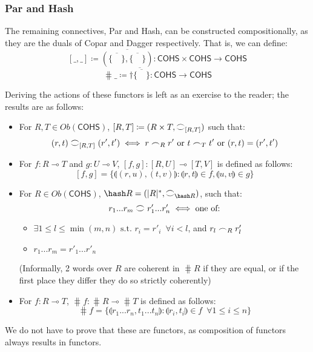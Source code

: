 \documentclass[11pt, oneside]{article}
\theoremstyle{plain}
\theoremstyle{definition}
\let\originaldagger\dagger
\renewcommand{\dag}{\mathord{\originaldagger}}
\newcommand{\lp}{\llparenthesis}
\newcommand{\rp}{\rrparenthesis}
\newcommand{\cohs}{{\mathsf{COHS}}}
\newcommand{\coh}[1][]{\mathrel{\vcenter{\offinterlineskip\hbox{$\frown$}\vskip0.2ex\hbox{$\smile$}}_{\ifx\\#1\\\else#1\fi}}}
\newcommand{\scoh}[1][]{\mathrel{\frown}_{\ifx\\#1\\\else#1\fi}}
\begin{document}
\subsubsection{Par and Hash}
The remaining connectives, Par and Hash, can be constructed compositionally, as they are the duals of Copar and Dagger respectively.
That is, we can define:
$$[\_,\_]\coloneqq\overline{(\overline{\{\quad\}},\overline{\{\quad\}})}:\cohs\times\cohs\to\cohs$$
$$\hash \_\coloneqq\overline{\dag\overline{\{\quad\}}}:\cohs\to\cohs$$

Deriving the actions of these functors is left as an exercise to the reader; the results are as follows:

\begin{itemize}
    \item
    For $R,T\in Ob(\cohs)$, $[R,T] \coloneqq (R\times T,\coh[{[R,T]}])$ such that:
    $$(r,t)\coh[{[R,T]}](r',t')\iff r\scoh[R]r'\text{ or }t\scoh[T]t'\text{ or }(r,t)=(r',t')$$

    \item
    For $f:R\multimap T$ and $g:U\multimap V$, 
    $[f,g]:[R,U]\multimap[T,V]$ is defined as follows:
    $$[f,g]=\{\lp(r,u),(t,v)\rp:\lp r,t\rp\in f,\lp u,v\rp\in g\}$$

    \item
        For $R\in Ob(\cohs)$, $\hash R=(|R|^*,\coh[\hash R])$, such that:
        $$r_1...r_m \coh r'_1...r'_n \iff \text{one of:}$$

        \begin{itemize}
            \item
            $\exists 1\leq l \leq \min(m,n) \text{ s.t. } r_i=r'_i \enspace\forall i<l$, and $r_l \scoh[R] r'_l$

            \item
            $r_1...r_m=r'_1...r'_n$
        \end{itemize}

        (Informally, 2 words over $R$ are coherent in $\hash R$ if they are equal, or if the first place they differ they do so strictly coherently)

        \item
        For $f:R\multimap T$, $\hash f:\hash R\multimap\hash T$ is defined as follows:
        $$\hash f=\{\lp r_1...r_n,t_1...t_n\rp:\lp r_i,t_i\rp\in f\enspace\forall 1\le i\le n\}$$
\end{itemize}

We do not have to prove that these are functors, as composition of functors always results in functors.
\end{document}
